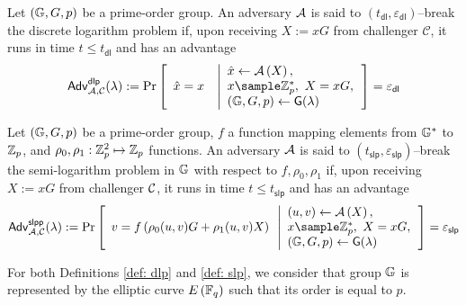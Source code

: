\documentclass[version=submission, floatrow]{iacrcc}
\begin{document}
\begin{definition}\label{def: dlp}
Let $\left(\mathbb{G}, G, p\right)$ be a prime-order group. An adversary $\mathcal{A}$ is said to $\left(t_{\mathsf{dl}}, \varepsilon_{\mathsf{dl}}\right)$--break the discrete logarithm problem if, upon receiving $X := xG$ from challenger $\mathcal{C}$, it runs in time $t \le t_{\mathsf{dl}}$ and has an advantage
\begin{equation}\label{eq:dlp}
    \mathsf{Adv}_{\Attacker, \Challenger}^{\mathsf{dlp}}(\lambda) := 
    \Probability{
    \begin{array}{ll}
    \\
    \Hat{x} = x\ \\
    \\
    \end{array}
    \left|
    \begin{array}{ll}
    \Hat{x} \leftarrow \Attacker\left(X\right),\\
    x \sample\Zpplus,\ X = xG,\\
    (\Group, G, p) \leftarrow \mathsf{G}(\lambda)
    \end{array}
    \right.} = \varepsilon_{\mathsf{dl}}
\end{equation}
\end{definition}

\begin{definition}\label{def: slp}
Let $\left(\mathbb{G}, G, p\right)$ be a prime-order group, $f$ a function mapping elements from $\mathbb{G}^{\ast}$ to $\mathbb{Z}_{p}$, and $\rho_{0},\rho_{1}: \mathbb{Z}_{p}^{2}\mapsto \mathbb{Z}_{p}$ functions. An adversary $\mathcal{A}$ is said to $\left(t_{\mathsf{slp}}, \varepsilon_{\mathsf{slp}}\right)$--break the semi-logarithm problem in $\mathbb{G}$ with respect to $f, \rho_{0}, \rho_{1}$ if, upon receiving $X := xG$ from challenger $\mathcal{C}$, it runs in time $t \le t_{\mathsf{slp}}$ and has an advantage
\begin{equation}\label{eq:slp}
    \mathsf{Adv}_{\Attacker, \Challenger}^{\mathsf{slpp}}(\lambda) := 
    \Probability{
    \begin{array}{ll}
    \\
    v = \ProjFunction{\rho_{0}(u, v)G + \rho_{1}(u,v)X} \\
    \\
    \end{array}
    \left|
    \begin{array}{ll}
    \left(u, v\right) \leftarrow \Attacker\left(X\right),\\
    x \sample\Zpplus,\ X = xG,\\
    (\Group, G, p) \leftarrow \mathsf{G}(\lambda)
    \end{array}
    \right.} = \varepsilon_{\mathsf{slp}}
\end{equation}
\end{definition}
For both Definitions \ref{def: dlp} and \ref{def: slp}, we consider that group $\mathbb{G}$ is represented by the elliptic curve $E \left(\mathbb{F}_{q}\right)$ such that its order is equal to $p$.
\end{document}
